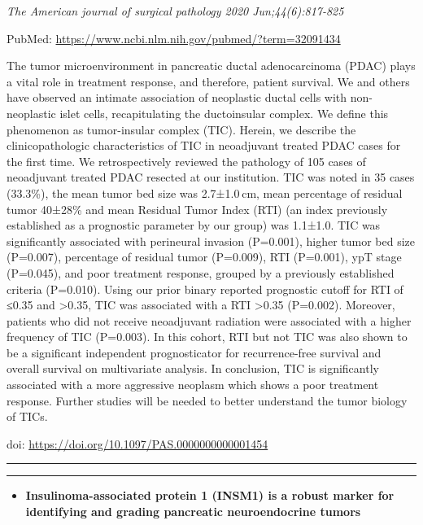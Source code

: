 \documentclass[
]{article}
\providecommand{\tightlist}{%
  \setlength{\itemsep}{0pt}\setlength{\parskip}{0pt}}
\begin{document}
\emph{The American journal of surgical pathology 2020 Jun;44(6):817-825}

PubMed: \url{https://www.ncbi.nlm.nih.gov/pubmed/?term=32091434}

The tumor microenvironment in pancreatic ductal adenocarcinoma (PDAC)
plays a vital role in treatment response, and therefore, patient
survival. We and others have observed an intimate association of
neoplastic ductal cells with non-neoplastic islet cells, recapitulating
the ductoinsular complex. We define this phenomenon as tumor-insular
complex (TIC). Herein, we describe the clinicopathologic characteristics
of TIC in neoadjuvant treated PDAC cases for the first time. We
retrospectively reviewed the pathology of 105 cases of neoadjuvant
treated PDAC resected at our institution. TIC was noted in 35 cases
(33.3\%), the mean tumor bed size was 2.7±1.0 cm, mean percentage of
residual tumor 40±28\% and mean Residual Tumor Index (RTI) (an index
previously established as a prognostic parameter by our group) was
1.1±1.0. TIC was significantly associated with perineural invasion
(P=0.001), higher tumor bed size (P=0.007), percentage of residual tumor
(P=0.009), RTI (P=0.001), ypT stage (P=0.045), and poor treatment
response, grouped by a previously established criteria (P=0.010). Using
our prior binary reported prognostic cutoff for RTI of ≤0.35 and
\textgreater0.35, TIC was associated with a RTI \textgreater0.35
(P=0.002). Moreover, patients who did not receive neoadjuvant radiation
were associated with a higher frequency of TIC (P=0.003). In this
cohort, RTI but not TIC was also shown to be a significant independent
prognosticator for recurrence-free survival and overall survival on
multivariate analysis. In conclusion, TIC is significantly associated
with a more aggressive neoplasm which shows a poor treatment response.
Further studies will be needed to better understand the tumor biology of
TICs.

doi: \url{https://doi.org/10.1097/PAS.0000000000001454}

\begin{center}\rule{0.5\linewidth}{0.5pt}\end{center}

\begin{center}\rule{0.5\linewidth}{0.5pt}\end{center}

\begin{itemize}
\tightlist
\item
  \textbf{Insulinoma-associated protein 1 (INSM1) is a robust marker for
  identifying and grading pancreatic neuroendocrine tumors}
\end{itemize}
\end{document}
